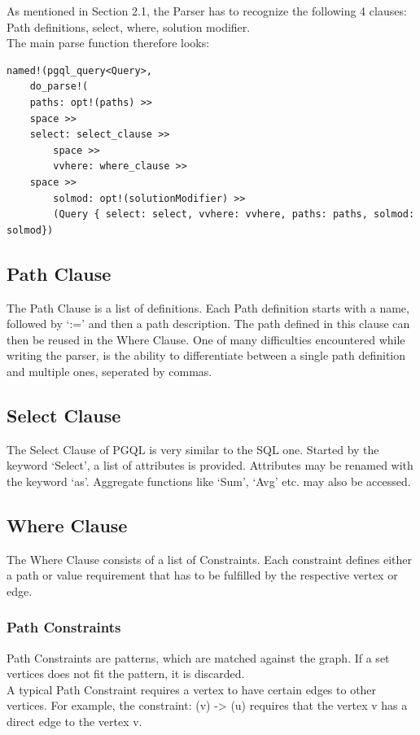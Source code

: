 \documentclass[11pt,singlecolumn]{scrartcl}
\begin{document}
As mentioned in Section 2.1, the Parser has to recognize the following 4 clauses: Path definitions, select, where, solution modifier.
\\The main parse function therefore looks:
\begin{lstlisting}
named!(pgql_query<Query>,
    do_parse!(
	paths: opt!(paths) >>
	space >>
	select: select_clause >>
        space >>
        vvhere: where_clause >>
	space >>
        solmod: opt!(solutionModifier) >>
        (Query { select: select, vvhere: vvhere, paths: paths, solmod: solmod})
 \end{lstlisting} 
\clearpage

\subsection{Path Clause}

The Path Clause is a list of definitions. Each Path definition starts with a name, followed by `:=' and then a path description. The path defined in this clause can then be reused in the Where Clause. One of many difficulties encountered while writing the parser, is the ability to differentiate between a single path definition and multiple ones, seperated by commas.


\clearpage
\subsection{Select Clause}
The Select Clause of PGQL is very similar to the SQL one. Started by the keyword `Select', a list of attributes is provided. Attributes may be renamed with the keyword `as'. Aggregate functions like `Sum', `Avg' etc. may also be accessed.

\clearpage

\subsection{Where Clause}
The Where Clause consists of a list of Constraints. Each constraint defines either a path or value requirement that has to be fulfilled by the respective vertex or edge.
 
 \subsubsection{Path Constraints}
 Path Constraints are patterns, which are matched against the graph. If a set vertices does not fit the pattern, it is discarded.\\
 A typical Path Constraint requires a vertex to have certain edges to other vertices. For example, the constraint: (v) -> (u) requires that the vertex v has a direct edge to the vertex v.
 
\end{document}
